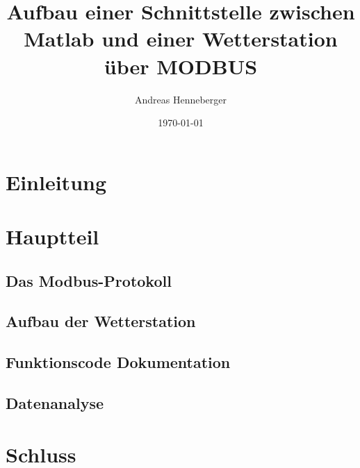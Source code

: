 \documentclass[11pt,a4paper,oneside,ngerman]{report}
\begin{document}
\begin{titlepage}
\author{Andreas Henneberger}
\title{Aufbau einer Schnittstelle zwischen Matlab und einer Wetterstation über MODBUS}
\date{\today}
\maketitle
\end{titlepage}
\part{Einleitung}
\part{Hauptteil}
\chapter{Das Modbus-Protokoll}
\chapter{Aufbau der Wetterstation}
\chapter{Funktionscode Dokumentation}
\chapter{Datenanalyse}
\part{Schluss}
\end{document}
